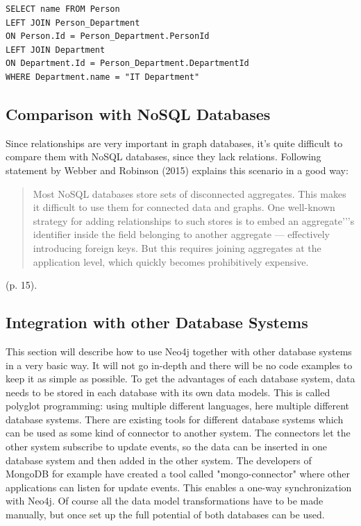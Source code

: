 \begin{lstlisting}[frame=single, caption=SQL Statement, label=gsqlstm]
SELECT name FROM Person
LEFT JOIN Person_Department
ON Person.Id = Person_Department.PersonId
LEFT JOIN Department
ON Department.Id = Person_Department.DepartmentId
WHERE Department.name = "IT Department"
\end{lstlisting}

\subsection{Comparison with NoSQL Databases}

Since relationships are very important in graph databases, it's quite difficult to compare them with NoSQL databases, since they lack relations. Following statement by Webber and Robinson (2015) explains this scenario in a good way:
\begin{quotation}
	Most NoSQL databases store sets of disconnected aggregates. This makes it difficult to use them for connected data and graphs.
	One well-known strategy for adding relationships to such stores is to embed an aggregate'’'s identifier inside the field belonging to another aggregate — effectively introducing foreign keys.
	But this requires joining aggregates at the application level, which quickly becomes prohibitively expensive.
\end{quotation} \cite{Webber.Robinson.2015} (p. 15).

\subsection{Integration with other Database Systems}
This section will describe how to use Neo4j together with other database systems in a very basic way. It will not go in-depth and there will be no code examples to keep it as simple as possible.
To get the advantages of each database system, data needs to be stored in each database with its own data models. This is called polyglot programming: using multiple different languages, here multiple different database systems. There are existing tools for different database systems which can be used as some kind of connector to another system. The connectors let the other system subscribe to update events, so the data can be inserted in one database system and then added in the other system. The developers of MongoDB for example have created a tool called "mongo-connector" where other applications can listen for update events. This enables a one-way synchronization with Neo4j. Of course all the data model transformations have to be made manually, but once set up the full potential of both databases can be used.

